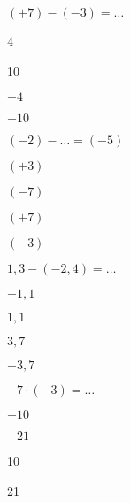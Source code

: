 \begin{QCM}
\begin{GroupeQCM}
    
    \begin{exercice}
      $(+7) - (-3) = \ldots$
      \begin{ChoixQCM}{4}
      \item 4
      \item 10
      \item $-4$
      \item $-10$
      \end{ChoixQCM}
\begin{corrige}
   \end{corrige}
    \end{exercice}
    
    
    \begin{exercice}
      $(-2) - \ldots = (-5)$
      \begin{ChoixQCM}{4}
      \item $(+3)$
      \item $(-7)$
      \item $(+7)$
      \item $(-3)$
      \end{ChoixQCM}
\begin{corrige}
   \end{corrige}
    \end{exercice}
    
    
    \begin{exercice}
      $1,3 - (-2,4) = \ldots$
      \begin{ChoixQCM}{4}
      \item $-1,1$
      \item $1,1$
      \item $3,7$
      \item $-3,7$
      \end{ChoixQCM}
\begin{corrige}
   \end{corrige}
    \end{exercice}
    
    
    \begin{exercice}
      $-7 \cdot (-3) = \ldots$
      \begin{ChoixQCM}{4}
      \item $-10$
      \item $-21$
      \item 10
      \item 21
      \end{ChoixQCM}
\begin{corrige}
   \end{corrige}
    \end{exercice}
    

\end{GroupeQCM}
\end{QCM}
